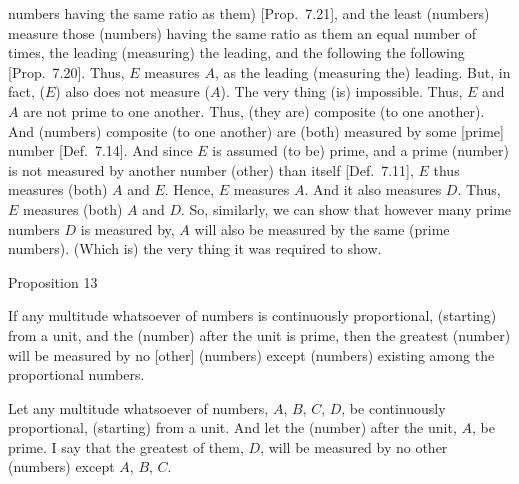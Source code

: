 numbers having the same ratio as them) [Prop.~7.21],
and the least (numbers) measure those (numbers) having the same ratio  as them an equal number of times, the leading (measuring) the leading, and the
following the following
[Prop.~7.20]. Thus, $E$
measures $A$, as the leading (measuring the) leading. But, in fact, 
($E$) also does not measure ($A$). The very thing (is) impossible. Thus,
$E$ and $A$ are not prime to one another. Thus, (they are) composite (to one another). And (numbers) composite (to one another) are (both) measured
by some [prime] number [Def.~7.14]. And since $E$
is assumed (to be) prime, and a prime (number) is not measured by  another number (other) than itself
[Def.~7.11], $E$ thus measures (both) $A$ and $E$. Hence, $E$ measures $A$. And it also measures $D$. Thus, $E$ measures (both) $A$ and $D$. So, similarly, we can show that however many prime
numbers $D$ is measured by, $A$ will also be measured by the same
(prime numbers). (Which is) the very thing it was required to show.


\begin{center}
{\large Proposition 13}
\end{center}

If  any multitude whatsoever of numbers is continuously proportional, (starting) from a unit, and the (number) after the
unit is prime, then the greatest (number) will be measured by no [other] (numbers) except (numbers) existing  among the proportional numbers.

Let any multitude whatsoever of numbers,  $A$, $B$, $C$, $D$, be continuously proportional, (starting) from a unit. And let the (number)
after the unit, $A$, be prime. I say that the greatest of them, $D$, will be
measured by no other (numbers) except $A$, $B$, $C$. 

\epsfysize=1.1in
\centerline{}

